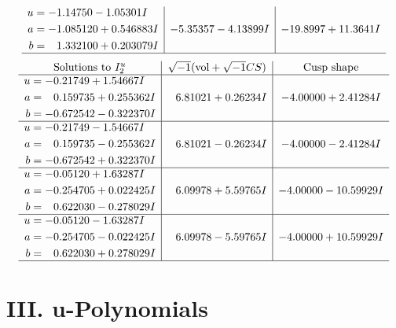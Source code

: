 \documentclass[1p]{elsarticle_modified}
\theoremstyle{definition}
\newcommand{\I}{\sqrt{-1}}
\begin{document}
$$\begin{array}{c|c|c}
\begin{aligned}
u &= -1.14750 - 1.05301 I \\
a &= -1.085120 + 0.546883 I \\
b &= \phantom{-}1.332100 + 0.203079 I\end{aligned}
 & -5.35357 - 4.13899 I & -19.8997 + 11.3641 I\\
 \hline 
 \end{array}$$\newpage$$\begin{array}{c|c|c}  
\text{Solutions to }I^u_{2}& \I (\text{vol} + \sqrt{-1}CS) & \text{Cusp shape}\\
 \hline 
\begin{aligned}
u &= -0.21749 + 1.54667 I \\
a &= \phantom{-}0.159735 + 0.255362 I \\
b &= -0.672542 - 0.322370 I\end{aligned}
 & \phantom{-}6.81021 + 0.26234 I & -4.00000 + 2.41284 I \\ \hline\begin{aligned}
u &= -0.21749 - 1.54667 I \\
a &= \phantom{-}0.159735 - 0.255362 I \\
b &= -0.672542 + 0.322370 I\end{aligned}
 & \phantom{-}6.81021 - 0.26234 I & -4.00000 - 2.41284 I \\ \hline\begin{aligned}
u &= -0.05120 + 1.63287 I \\
a &= -0.254705 + 0.022425 I \\
b &= \phantom{-}0.622030 - 0.278029 I\end{aligned}
 & \phantom{-}6.09978 + 5.59765 I & -4.00000 - 10.59929 I \\ \hline\begin{aligned}
u &= -0.05120 - 1.63287 I \\
a &= -0.254705 - 0.022425 I \\
b &= \phantom{-}0.622030 + 0.278029 I\end{aligned}
 & \phantom{-}6.09978 - 5.59765 I & -4.00000 + 10.59929 I\\
 \hline 
 \end{array}$$\newpage
\newpage\renewcommand{\arraystretch}{1}
\centering \section*{ III. u-Polynomials}
\end{document}
